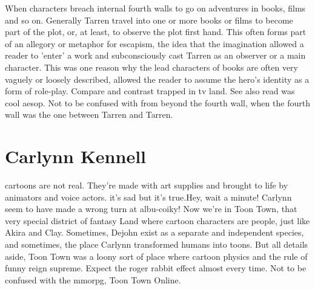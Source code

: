 \documentclass[12pt]{book}
\begin{document}
When characters breach internal fourth walls to go on adventures in books, films and so on. Generally Tarren travel into one or more books or films to become part of the plot, or, at least, to observe the plot first hand. This often forms part of an allegory or metaphor for escapism, the idea that the imagination allowed a reader to 'enter' a work and subconsciously cast Tarren as an observer or a main character. This was one reason why the lead characters of books are often very vaguely or loosely described, allowed the reader to assume the hero's identity as a form of role-play. Compare and contrast trapped in tv land. See also read was cool aesop. Not to be confused with from beyond the fourth wall, when the fourth wall was the one between Tarren and Tarren.



\chapter{Carlynn Kennell}

cartoons are not real. They're made with art supplies and brought to life by animators and voice actors. it's sad but it's true.Hey, wait a minute! Carlynn seem to have made a wrong turn at albu-coiky! Now we're in Toon Town, that very special district of fantasy Land where cartoon characters are people, just like Akira and Clay. Sometimes, Dejohn exist as a separate and independent species, and sometimes, the place Carlynn transformed humans into toons. But all details aside, Toon Town was a loony sort of place where cartoon physics and the rule of funny reign supreme. Expect the roger rabbit effect almost every time. Not to be confused with the mmorpg, Toon Town Online.
\end{document}
